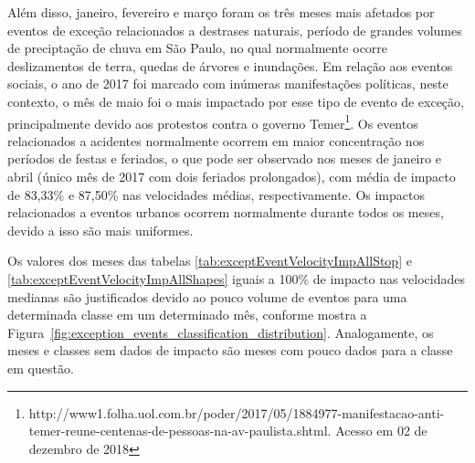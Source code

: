 \documentclass[
	12pt,				%
	oneside,			%
	a4paper,			%
	english,			%
	brazil				%
	]{abntex2ppgsi}
\begin{document}
{{{Além disso, janeiro, fevereiro e março foram os três meses mais afetados por eventos de exceção relacionados a destrases naturais, período de grandes volumes de preciptação de chuva em São Paulo, no qual normalmente ocorre deslizamentos de terra, quedas de árvores e inundações.  Em relação aos eventos sociais, o ano de 2017 foi marcado com inúmeras manifestações políticas, neste contexto, o mês de maio foi o mais impactado por esse tipo de evento de exceção, principalmente devido aos protestos contra o governo Temer\footnote{{http://www1.folha.uol.com.br/poder/2017/05/1884977-manifestacao-anti-temer-reune-centenas-de-pessoas-na-av-paulista.shtml}. Acesso em 02 de dezembro de 2018}. Os eventos relacionados a acidentes normalmente ocorrem em maior concentração nos períodos de festas e feriados, o que pode ser observado nos meses de janeiro e abril (único mês de 2017 com dois feriados prolongados), com média de impacto de 83,33\% e 87,50\% nas velocidades médias, respectivamente.  Os impactos relacionados a eventos urbanos ocorrem normalmente durante todos os meses, devido a isso são mais uniformes.

Os valores dos meses das tabelas \ref{tab:exceptEventVelocityImpAllStop} e \ref{tab:exceptEventVelocityImpAllShapes} iguais a 100\% de impacto nas velocidades medianas são justificados devido ao pouco volume de eventos para uma determinada classe em um determinado mês, conforme mostra a Figura~\ref{fig:exception_events_classification_distribution}. Analogamente, os meses e classes sem dados de impacto são meses com pouco dados para a classe em questão.

}}}
\end{document}
